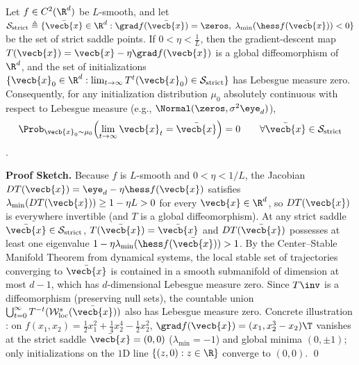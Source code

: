 \documentclass[../../../../master.tex]{subfiles}
\begin{document}
\begin{coremath}
\label{thm:gdconv:strict_saddle}
Let $f \in C^2(\R^d)$ be $L$-smooth, and let $\mathcal{S}_{\mathrm{strict}} \triangleq \{\bar{\vecb{x}} \in \R^d : \grad f(\bar{\vecb{x}}) = \zeros,\; \lambda_{\min}(\hess f(\bar{\vecb{x}})) < 0\}$ be the set of strict saddle points. If $0 < \eta < \frac{1}{L}$, then the gradient-descent map $T(\vecb{x}) = \vecb{x} - \eta\grad f(\vecb{x})$ is a global diffeomorphism of $\R^d$, and the set of initializations $\{\vecb{x}_0 \in \R^d : \lim_{t\to\infty} T^t(\vecb{x}_0) \in \mathcal{S}_{\mathrm{strict}}\}$ has Lebesgue measure zero. Consequently, for any initialization distribution $\mu_0$ absolutely continuous with respect to Lebesgue measure (e.g., $\Normal(\zeros, \sigma^2\eye_d)$),
\begin{equation}
\label{eq:gdconv:saddle_prob}
  \Prob_{\vecb{x}_0 \sim \mu_0}\!\left(\lim_{t\to\infty} \vecb{x}_t = \bar{\vecb{x}}\right) = 0 \qquad \forall \bar{\vecb{x}} \in \mathcal{S}_{\mathrm{strict}}
\end{equation}
.
\end{coremath}

\textbf{Proof Sketch.}
Because $f$ is $L$-smooth and $0 < \eta < 1/L$, the Jacobian $DT(\vecb{x}) = \eye_d - \eta\hess f(\vecb{x})$ satisfies $\lambda_{\min}(DT(\vecb{x})) \ge 1 - \eta L > 0$ for every $\vecb{x} \in \R^d$, so $DT(\vecb{x})$ is everywhere invertible (and $T$ is a global diffeomorphism). At any strict saddle $\bar{\vecb{x}} \in \mathcal{S}_{\mathrm{strict}}$, $T(\bar{\vecb{x}}) = \bar{\vecb{x}}$ and $DT(\bar{\vecb{x}})$ possesses at least one eigenvalue $1 - \eta\lambda_{\min}(\hess f(\bar{\vecb{x}})) > 1$. By the Center--Stable Manifold Theorem from dynamical systems, the local stable set of trajectories converging to $\bar{\vecb{x}}$ is contained in a smooth submanifold of dimension at most $d - 1$, which has $d$-dimensional Lebesgue measure zero. Since $T\inv$ is a diffeomorphism (preserving null sets), the countable union $\bigcup_{t=0}^\infty T^{-t}(\mathcal{W}_{\mathrm{loc}}^s(\bar{\vecb{x}}))$ also has Lebesgue measure zero. Concrete illustration : on $f(x_1, x_2) = \frac{1}{2}x_1^2 + \frac{1}{4}x_2^4 - \frac{1}{2}x_2^2$, $\grad f(\vecb{x}) = (x_1, x_2^3 - x_2)\T$ vanishes at the strict saddle $\bar{\vecb{x}}=(0,0)$ ($\lambda_{\min} = -1$) and global minima $(0, \pm 1)$; only initializations on the $1$D line $\{(z,0) : z \in \R\}$ converge to $(0,0)$. \qed
\end{document}
